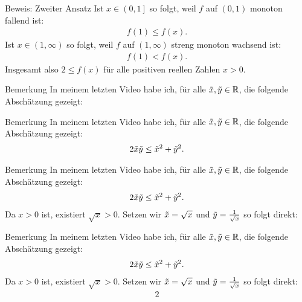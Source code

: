 \documentclass[10pt]{beamer}
\def\bR{\mathbb{R}}
\begin{document}
\begin{frame}{Beweis: Zweiter Ansatz}
    Ist \( x \in \left( 0, 1 \right] \) so folgt, weil \( f \) auf \( \left( 0, 1 \right) \) monoton fallend ist:
    \begin{align*}
        f( 1 )
        \leq f( x ).
    \end{align*}
    Ist \( x \in \left( 1, \infty \right) \) so folgt, weil \( f \) auf \( \left( 1, \infty \right) \) streng monoton wachsend ist:
    \begin{align*}
        f( 1 )
        < f( x ).
    \end{align*}
    Insgesamt also \( 2 \leq f( x ) \) für alle positiven reellen Zahlen \( x > 0 \).
\end{frame}



\begin{frame}{Bemerkung}
    In meinem letzten Video habe ich, für alle \( \Tilde{x}, \Tilde{y} \in \bR \), die folgende Abschätzung gezeigt:    
\end{frame}



\begin{frame}{Bemerkung}
    In meinem letzten Video habe ich, für alle \( \Tilde{x}, \Tilde{y} \in \bR \), die folgende Abschätzung gezeigt:
    \begin{align*}
        2\Tilde{x}\Tilde{y}
        \leq \Tilde{x}^{2} + \Tilde{y}^{2}.
    \end{align*}
\end{frame}



\begin{frame}{Bemerkung}
    In meinem letzten Video habe ich, für alle \( \Tilde{x}, \Tilde{y} \in \bR \), die folgende Abschätzung gezeigt:
    \begin{align*}
        2\Tilde{x}\Tilde{y}
        \leq \Tilde{x}^{2} + \Tilde{y}^{2}.
    \end{align*}
    Da \( x > 0 \) ist, existiert \( \sqrt{x} > 0 \). Setzen wir \( \Tilde{x} = \sqrt{x} \) und \( \Tilde{y} = \frac{1}{\sqrt{x}} \) so folgt direkt:
\end{frame}



\begin{frame}{Bemerkung}
    In meinem letzten Video habe ich, für alle \( \Tilde{x}, \Tilde{y} \in \bR \), die folgende Abschätzung gezeigt:
    \begin{align*}
        2\Tilde{x}\Tilde{y}
        \leq \Tilde{x}^{2} + \Tilde{y}^{2}.
    \end{align*}
    Da \( x > 0 \) ist, existiert \( \sqrt{x} > 0 \). Setzen wir \( \Tilde{x} = \sqrt{x} \) und \( \Tilde{y} = \frac{1}{\sqrt{x}} \) so folgt direkt:
    \begin{align*}
        2
    \end{align*}
\end{frame}
\end{document}
